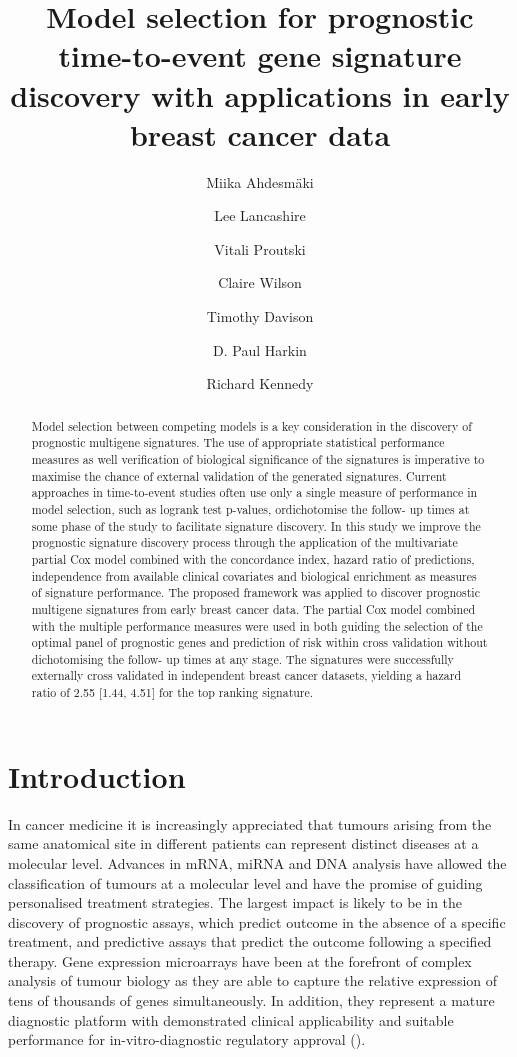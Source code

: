 \documentclass[letterpaper,12pt]{article}
\title{Model selection for prognostic time-to-event gene signature discovery with applications in early breast cancer data}
\author[1]{Miika Ahdesm\"aki}
\author[1]{Lee Lancashire}
\author[1]{Vitali Proutski}
\author[1]{Claire Wilson}
\author[1]{Timothy Davison}
\author[1,2]{D. Paul Harkin}
\author[1,2]{Richard Kennedy}
\affil[1]{Almac Diagnostics, 19 Seagoe Industrial Estate, BT63 5QD Craigavon, United Kingdom}
\affil[2]{Queen's University of Belfast, Centre for Cancer Research and Cell Biology, BT9 7BL Belfast, United Kingdom}
\begin{document}
\maketitle

\begin{abstract}
Model selection between competing models is a key consideration in the
discovery of prognostic multigene signatures. The use of appropriate
statistical performance measures as well verification of biological
significance of the signatures is imperative to maximise the chance of
external validation of the generated signatures. Current approaches in
time-to-event studies often use only a single measure of performance in
model selection, such as logrank test p-values, ordichotomise the follow-
up times at some phase of the study to facilitate signature discovery. In
this study we improve the prognostic signature discovery process through
the application of the multivariate partial Cox model combined with the
concordance index, hazard ratio of predictions, independence from
available clinical covariates and biological enrichment as measures of
signature performance. The proposed framework was applied to discover
prognostic multigene signatures from early breast cancer data. The partial
Cox model combined with the multiple performance measures were used in
both guiding the selection of the optimal panel of prognostic genes and
prediction of risk within cross validation without dichotomising the follow-
up times at any stage. The signatures were successfully externally cross
validated in independent breast cancer datasets, yielding a hazard ratio of
2.55 [1.44, 4.51] for the top ranking signature. 
\end{abstract}

\section{Introduction}
In cancer medicine it is increasingly appreciated that tumours arising from the same anatomical site in different patients can represent distinct diseases at a molecular level. Advances in mRNA, miRNA and DNA analysis have allowed the classification of tumours at a molecular level and have the promise of guiding personalised treatment strategies. The largest impact is likely to be in the discovery of prognostic assays, which predict outcome in the absence of a specific treatment, and predictive assays that predict the outcome following a specified therapy. Gene expression microarrays have been at the forefront of complex analysis of tumour biology as they are able to capture the relative expression of tens of thousands of genes simultaneously. In addition, they represent a mature diagnostic platform with demonstrated clinical applicability and suitable performance for in-vitro-diagnostic regulatory approval (\citet{Veer:02,Pillai:11}).
\end{document}

